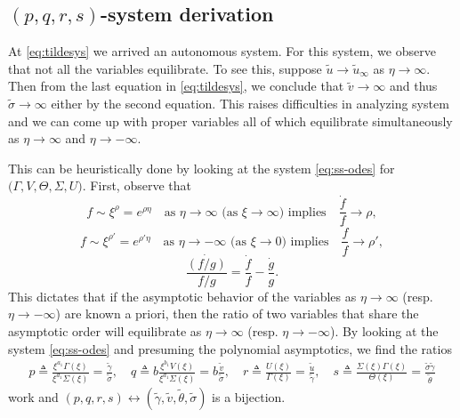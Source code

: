 \documentclass[a4paper,11pt]{article}
\def\tg{{\tilde{\gamma}}}
\def\tv{{\tilde{v}}}
\def\tth{{\tilde{\theta}}}
\def\ts{{\tilde{\sigma}}}
\def\tu{{\tilde{u}}}
\theoremstyle{remark}
\begin{document}
\subsection{$(p,q,r,s)$-system derivation}
At \eqref{eq:tildesys} we arrived  an autonomous system. For this system, we observe that not all the variables equilibrate. To see this, suppose $\tu \rightarrow \tu_\infty$ as $\eta \rightarrow \infty$. Then from the last equation in \eqref{eq:tildesys}, we conclude that $\tv \rightarrow \infty$ and thus $\ts \rightarrow \infty$ either by the second equation. This raises difficulties in analyzing system and we can come up with proper variables all of which equilibrate simultaneously as $\eta \rightarrow \infty$ and $\eta \rightarrow -\infty$.

This can be heuristically done by looking at the system \eqref{eq:ss-odes} for $\big(\Gamma,V,\Theta,\Sigma,U)$. First, observe that
$$ f \sim \xi^\rho=e^{\rho\eta} \quad \text{as $\eta \rightarrow \infty$ (as $\xi \rightarrow \infty$) implies} \quad \frac{\dot{f}}{f} \rightarrow \rho,$$
$$ f \sim \xi^{\rho'}=e^{\rho'\eta} \quad \text{as $\eta \rightarrow -\infty$ (as $\xi \rightarrow 0$) implies} \quad \frac{\dot{f}}{f} \rightarrow \rho',$$
$$ \frac{\dot{(f/g)}}{f/g} = \frac{\dot{f}}{f} - \frac{\dot{g}}{g}. $$
This dictates that if the asymptotic behavior of the variables as $\eta \rightarrow \infty$ (resp. $\eta \rightarrow -\infty$) are known a priori, then the ratio of two variables that share the asymptotic order will equilibrate as $\eta \rightarrow \infty$ (resp. $\eta \rightarrow -\infty$). By looking at the system \eqref{eq:ss-odes} and presuming the polynomial asymptotics, we find the ratios
\begin{equation}\label{eq:pqrdef}
 \begin{aligned}
  p \triangleq \frac{ \xi^{a_1} \Gamma(\xi)}{\xi^{d_1} \Sigma(\xi)}=\frac{\tg}{\ts}, \quad q \triangleq b\frac{ \xi^{b_1} V(\xi) }{ \xi^{d_1} \Sigma(\xi)}=b \frac{\tv}{\ts},  \quad r \triangleq \frac{ U(\xi) }{ \Gamma(\xi) } = \frac{\tu}{\tg}, \quad s \triangleq \frac{\Sigma(\xi)\Gamma(\xi)}{\Theta(\xi)} = \frac{\ts\tg}{\tth}
 \end{aligned}
\end{equation}
 work and $(p,q,r,s) \leftrightarrow (\tg,\tv, \tth,\ts)$ is a bijection.
\end{document}
